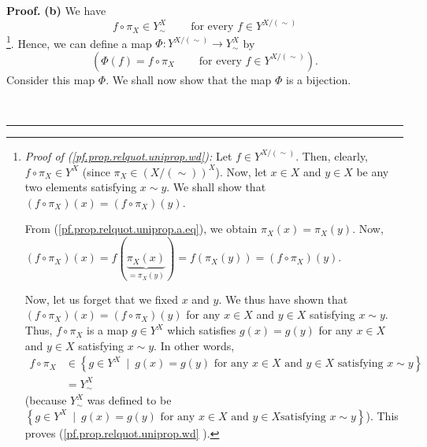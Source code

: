 \documentclass[numbers=enddot,12pt,final,onecolumn,notitlepage]{scrartcl}%
\theoremstyle{definition}
\newenvironment{proof}[1][Proof]{\noindent\textbf{#1.} }{\ \rule{0.5em}{0.5em}}
\newenvironment{verlong}{}{}
\begin{document}
\begin{verlong}
\begin{proof}
\textbf{(b)} We have%
\begin{equation}
f\circ\pi_{X}\in Y_{\sim}^{X}\ \ \ \ \ \ \ \ \ \ \text{for every }f\in
Y^{X/\left(  \sim\right)  } \label{pf.prop.relquot.uniprop.wd}%
\end{equation}
\footnote{\textit{Proof of (\ref{pf.prop.relquot.uniprop.wd}):} Let $f\in
Y^{X/\left(  \sim\right)  }$. Then, clearly, $f\circ\pi_{X}\in Y^{X}$ (since
$\pi_{X}\in\left(  X/\left(  \sim\right)  \right)  ^{X}$). Now, let $x\in X$
and $y\in X$ be any two elements satisfying $x\sim y$. We shall show that
$\left(  f\circ\pi_{X}\right)  \left(  x\right)  =\left(  f\circ\pi
_{X}\right)  \left(  y\right)  $.
\par
From (\ref{pf.prop.relquot.uniprop.a.eq}), we obtain $\pi_{X}\left(  x\right)
=\pi_{X}\left(  y\right)  $. Now, $\left(  f\circ\pi_{X}\right)  \left(
x\right)  =f\left(  \underbrace{\pi_{X}\left(  x\right)  }_{=\pi_{X}\left(
y\right)  }\right)  =f\left(  \pi_{X}\left(  y\right)  \right)  =\left(
f\circ\pi_{X}\right)  \left(  y\right)  $.
\par
Now, let us forget that we fixed $x$ and $y$. We thus have shown that $\left(
f\circ\pi_{X}\right)  \left(  x\right)  =\left(  f\circ\pi_{X}\right)  \left(
y\right)  $ for any $x\in X$ and $y\in X$ satisfying $x\sim y$. Thus,
$f\circ\pi_{X}$ is a map $g\in Y^{X}$ which satisfies $g\left(  x\right)
=g\left(  y\right)  $ for any $x\in X$ and $y\in X$ satisfying $x\sim y$. In
other words,%
\begin{align*}
f\circ\pi_{X}  &  \in\left\{  g\in Y^{X}\ \mid\ g\left(  x\right)  =g\left(
y\right)  \text{ for any }x\in X\text{ and }y\in X\text{ satisfying }x\sim
y\right\} \\
&  =Y_{\sim}^{X}%
\end{align*}
(because $Y_{\sim}^{X}$ was defined to be $\left\{  g\in Y^{X}\ \mid\ g\left(
x\right)  =g\left(  y\right)  \text{ for any }x\in X\text{ and }y\in X\text{
satisfying }x\sim y\right\}  $). This proves (\ref{pf.prop.relquot.uniprop.wd}%
).}. Hence, we can define a map $\Phi:Y^{X/\left(  \sim\right)  }\rightarrow
Y_{\sim}^{X}$ by%
\begin{equation}
\left(  \Phi\left(  f\right)  =f\circ\pi_{X}\ \ \ \ \ \ \ \ \ \ \text{for
every }f\in Y^{X/\left(  \sim\right)  }\right)  .
\label{pf.prop.relquot.uniprop.Phi}%
\end{equation}
Consider this map $\Phi$. We shall now show that the map $\Phi$ is a bijection.


\end{proof}
\end{verlong}
\end{document}

